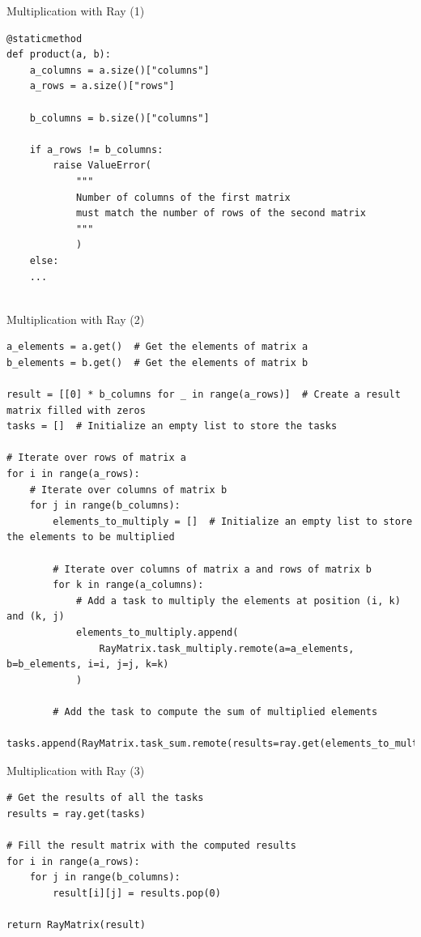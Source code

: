 \documentclass{beamer}
\begin{document}
\begin{frame}[fragile]{Multiplication with Ray (1)}
    \begin{small}
        \begin{verbatim}
@staticmethod
def product(a, b):
    a_columns = a.size()["columns"]
    a_rows = a.size()["rows"]

    b_columns = b.size()["columns"]

    if a_rows != b_columns:
        raise ValueError(
            """
            Number of columns of the first matrix 
            must match the number of rows of the second matrix
            """
            )
    else:
    ...
    
    \end{verbatim}
    \end{small}
\end{frame}

\begin{frame}[fragile]{Multiplication with Ray (2)}
    \begin{tiny}
        \begin{verbatim}
a_elements = a.get()  # Get the elements of matrix a
b_elements = b.get()  # Get the elements of matrix b

result = [[0] * b_columns for _ in range(a_rows)]  # Create a result matrix filled with zeros
tasks = []  # Initialize an empty list to store the tasks

# Iterate over rows of matrix a
for i in range(a_rows):
    # Iterate over columns of matrix b
    for j in range(b_columns):
        elements_to_multiply = []  # Initialize an empty list to store the elements to be multiplied
        
        # Iterate over columns of matrix a and rows of matrix b
        for k in range(a_columns):
            # Add a task to multiply the elements at position (i, k) and (k, j)
            elements_to_multiply.append(
                RayMatrix.task_multiply.remote(a=a_elements, b=b_elements, i=i, j=j, k=k)
            )
        
        # Add the task to compute the sum of multiplied elements
        tasks.append(RayMatrix.task_sum.remote(results=ray.get(elements_to_multiply)))
    \end{verbatim}
    \end{tiny}
\end{frame}

\begin{frame}[fragile]{Multiplication with Ray (3)}
    \begin{verbatim}
# Get the results of all the tasks
results = ray.get(tasks)

# Fill the result matrix with the computed results
for i in range(a_rows):
    for j in range(b_columns):
        result[i][j] = results.pop(0)

return RayMatrix(result)
            
    \end{verbatim}
\end{frame}
\end{document}
